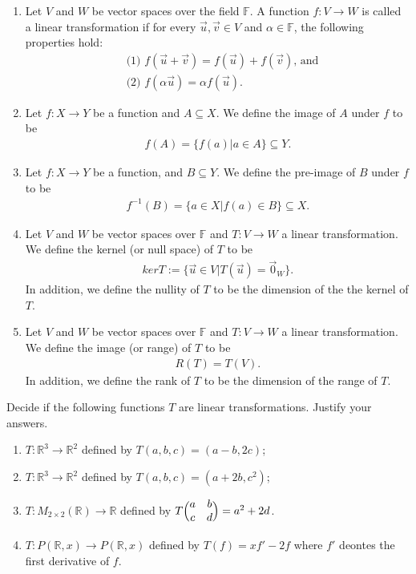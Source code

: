 \documentclass[12pt,answers]{exam}
\newcommand{\F}{\mathbb{F}}
\newcommand{\R}{\mathbb{R}}
\newenvironment{problem}[2][Problem]{\begin{trivlist}
\item[\hskip \labelsep {\bfseries #1}\hskip \labelsep {\bfseries #2.}]}{\end{trivlist}}
\begin{document}
\begin{solution}
\begin{enumerate}[label=(\alph*)]
\item Let $V$ and $W$ be vector spaces over the field $\F$. A function $f:V\rightarrow W$ is called a linear transformation if for every $\vec{u},\vec{v}\in V$ and $\alpha \in \F$, the following properties hold:
\begin{align*}
	&\text{(1) } f(\vec{u}+\vec{v})=f(\vec{u})+f(\vec{v}) \text{, and} \\
	&\text{(2) } f(\alpha \vec{u})=\alpha f(\vec{u}).
\end{align*}
\item Let $f:X\rightarrow Y$ be a function and $A\subseteq X$. We define the image of $A$ under $f$ to be
\begin{align*}
	f(A)=\{f(a)|a\in A\}\subseteq Y.
\end{align*}
\item Let $f:X\rightarrow Y$ be a function, and $B\subseteq Y$. We define the pre-image of $B$ under $f$ to be
\begin{align*}
	f^{-1}(B)=\{a\in X|f(a)\in B\}\subseteq X.
\end{align*}
\item Let $V$ and $W$ be vector spaces over $\F$ and $T:V\rightarrow W$ a linear transformation. We define the kernel (or null space) of $T$ to be
\begin{align*}
	kerT:=\{\vec{u}\in V|T(\vec{u})=\vec{0}_W\}.
\end{align*}
In addition, we define the nullity of $T$ to be the dimension of the the kernel of $T$.
\item Let $V$ and $W$ be vector spaces over $\F$ and $T:V\rightarrow W$ a linear transformation. We define the image (or range) of $T$ to be
\begin{align*}
	R(T)=T(V).
\end{align*}
In addition, we define the rank of $T$ to be the dimension of the range of $T$. 
\end{enumerate}
\end{solution}

\begin{problem}{2}
Decide if the following functions $T$ are linear transformations. Justify your answers. 
\begin{enumerate}[label=\roman*)]
\item $T:\R^{3}\rightarrow \R^{2}$ defined by $T(a,b,c)=(a-b,2c)$;
\item $T:\R^{3}\rightarrow \R^{2}$ defined by $T(a,b,c)=(a+2b,c^{2})$;
\item $T:M_{2\times 2}(\R)\rightarrow \R$ defined by $T\Bigl( \begin{matrix}a & b\\ c & d\end{matrix}\Bigr)=a^{2}+2d$.
\item $T:P(\R,x)\rightarrow P(\R,x)$ defined by $T(f)=xf'-2f$ where $f'$ deontes the first derivative of $f$.
\end{enumerate}
\end{problem}
\end{document}
